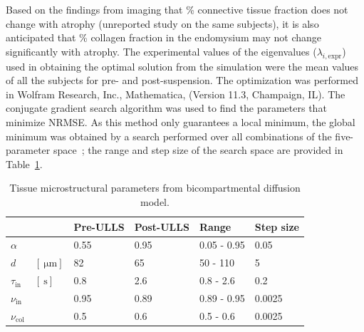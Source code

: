 Based on the findings from imaging that \% connective tissue fraction does not change with atrophy (unreported study on the same subjects), it is also anticipated that \% collagen fraction in the endomysium may not change significantly with atrophy. 
The experimental values of the eigenvalues ($\lambda_{i,\mathrm{expr}}$) used in obtaining the optimal solution from the simulation were the mean values of all the subjects for pre- and post-suspension. 
The optimization was performed in Wolfram Research, Inc., Mathematica, (Version 11.3, Champaign, IL). 
The conjugate gradient search algorithm was used to find the parameters that minimize NRMSE. 
As this method only guarantees a local minimum, the global minimum was obtained by a search performed over all combinations of the five-parameter space~\cite{BiComp}; the range and step size of the search space are provided in Table~\ref{tab: Karger2}.
\begin{table}[!htb]
\vspace{+0.2cm}
\caption[Tissue microstructural parameters from bicompartmental diffusion model]{Tissue microstructural parameters from bicompartmental diffusion model.}
\label{tab: Karger2}
\begin{center}
\begin{tabular}{@{}llllll@{}}
\toprule[1pt]\midrule[0.3pt]
  & & Pre-ULLS & Post-ULLS & Range     & Step size \\ \midrule
$\alpha$     & & 0.55     & 0.95      & 0.05 - 0.95 & 0.05      \\[6pt]
$d$ & $[\SI{}{\micro\meter}]$   & 82       & 65        & 50 - 110    & 5         \\[6pt]
$\tau_{\mathrm{in}}$ & $\left[\SI{}{\second}\right]$   & 0.8      & 2.6       & 0.8 - 2.6   & 0.2       \\[6pt]
$\nu_{\mathrm{in}}$  & &0.95     & 0.89      & 0.89 - 0.95 & 0.0025    \\[6pt]
$\nu_{\mathrm{col}}$ & &0.5      & 0.6       & 0.5 - 0.6   & 0.0025    \\ \midrule[0.3pt]\toprule[1pt]
\end{tabular}
\end{center}
\vspace{-0.2cm}
\end{table}
